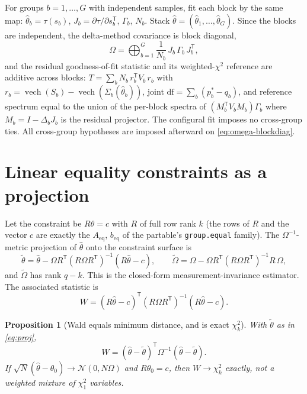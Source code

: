 \documentclass[11pt]{article}
\newcommand{\T}{^{\mathsf T}}
\newcommand{\vech}{\operatorname{vech}}
\newcommand{\Om}{\Omega}
\theoremstyle{plain}
\newtheorem{proposition}{Proposition}
\theoremstyle{remark}
\begin{document}
For groups $b = 1,\dots,G$ with independent samples, fit each block by the
same map: $\hat\theta_b = \tau(s_b)$, $J_b = \partial\tau/\partial s_b\T$,
$\Gamma_b$, $N_b$. Stack $\hat\theta = (\hat\theta_1,\dots,\hat\theta_G)$. Since
the blocks are independent, the delta-method covariance is block diagonal,
\begin{equation}
  \Om = \bigoplus_{b=1}^{G} \frac{1}{N_b}\, J_b\, \Gamma_b\, J_b\T ,
  \label{eq:omega-blockdiag}
\end{equation}
and the residual goodness-of-fit statistic and its weighted-$\chi^2$ reference
are additive across blocks: $T = \sum_b N_b\, r_b\T V_b\, r_b$ with
$r_b = \vech(S_b) - \vech(\Sigma_b(\hat\theta_b))$, joint
$\mathrm{df} = \sum_b (p_b^\ast - q_b)$, and reference spectrum equal to the
union of the per-block spectra of $(M_b\T V_b M_b)\Gamma_b$ where
$M_b = I - \Delta_b J_b$ is the residual projector. The configural fit imposes
no cross-group ties. All cross-group hypotheses are imposed afterward on
\eqref{eq:omega-blockdiag}.

\section{Linear equality constraints as a projection}

Let the constraint be $R\theta = c$ with $R$ of full row rank $k$ (the rows of
$R$ and the vector $c$ are exactly the $A_{\mathrm{eq}}$, $b_{\mathrm{eq}}$ of the
partable's \texttt{group.equal} family). The $\Om^{-1}$-metric projection of
$\hat\theta$ onto the constraint surface is
\begin{equation}
  \tilde\theta
   = \hat\theta - \Om R\T (R\Om R\T)^{-1}(R\hat\theta - c),
  \qquad
  \tilde\Om
   = \Om - \Om R\T (R\Om R\T)^{-1} R\, \Om ,
  \label{eq:proj}
\end{equation}
and $\tilde\Om$ has rank $q - k$. This is the closed-form
measurement-invariance estimator. The associated statistic is
\begin{equation}
  W = (R\hat\theta - c)\T (R\Om R\T)^{-1}(R\hat\theta - c).
  \label{eq:wald}
\end{equation}

\begin{proposition}[Wald equals minimum distance, and is exact $\chi^2_k$]
\label{prop:duality}
With $\tilde\theta$ as in \eqref{eq:proj},
\[
  W
  = (\hat\theta - \tilde\theta)\T \Om^{-1} (\hat\theta - \tilde\theta) .
\]
If $\sqrt{N}(\hat\theta - \theta_0) \to \mathcal N(0, N\Om)$ and $R\theta_0 = c$,
then $W \to \chi^2_k$ exactly, not a weighted mixture of $\chi^2_1$ variables.
\end{proposition}
\end{document}

